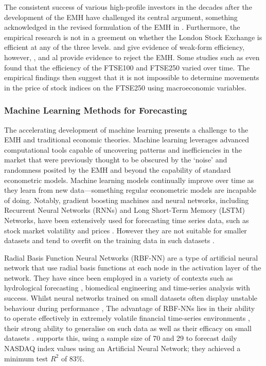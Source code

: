 \documentclass[11pt,a4paper]{article}
\newcommand{\citeboth}[1]{\citeauthor{#1} \citep{#1}}
\begin{document}
The consistent success of various high-profile investors in the decades 
after the development of the EMH have challenged 
its central argument, something acknowledged in the revised formulation of the EMH 
in \citeboth{fama1991}. Furthermore, the empirical research is not in a
greement on whether the London Stock Exchange is efficient at any of the three levels. 
\citeboth{libberton2010} and \citeboth{rounaghi} give evidence of weak-form efficiency,
however, \citeboth{borges2010}, \citeboth{asghar2023} and \citeboth{bhavsar2015} al provide evidence to reject the EMH. 
Some studies such as \citeboth{rosini2020} even found that the 
efficiency of the FTSE100 and FTSE250 varied over time. The empirical findings then suggest 
that it is not impossible to determine movements in the 
price of stock indices on the FTSE250 using macroeconomic variables.

\subsubsection{Machine Learning Methods for Forecasting}

The accelerating development of machine learning presents a challenge to the EMH
and traditional economic theories. 
Machine learning leverages advanced computational 
tools capable of uncovering patterns and inefficiencies 
in the market that were previously thought to be obscured by the 
‘noise’ and randomness posited by the EMH and beyond the capability 
of standard econometric models. Machine learning models continually 
improve over time as they learn from new data—something regular 
econometric models are incapable of doing. Notably, gradient boosting machines and neural networks, including 
Recurrent Neural Networks (RNNs) and Long Short-Term Memory (LSTM) 
Networks, have been extensively used for forecasting time series data, 
such as stock market volatility \citep{cho2022forecasting,praveenraj2023} and prices \citep{zhang2022lstm,song2023forecasting,dutta2024hybrid}. However they 
are not suitable for smaller datasets and tend to overfit on the training data
in such datasets \citep{foster1992}.

Radial Basis Function Neural Networks (RBF-NN) are a type of artificial 
neural network that use radial basis functions at each node in the 
activation layer of the network. They have since been employed in a variety of contexts such as 
hydrological forecasting \citep{chang2001}, biomedical engineering 
\citep{ibrikci2002} and time-series analysis \citep{xiong2015} with success. 
Whilst neural networks trained on small datasets often display unstable 
behaviour during performance \citep{lebaron1998}, The advantage of 
RBF-NNs lies in their ability to 
operate effectively in extremely volatile financial time-series 
environments \citep{cafferata2019}, their strong ability to 
generalise on such data \citep{sharkawy2020} as well as their efficacy on small datasets \citep{kosarac2022}. 
\citeboth{esfandyari2016}
supports this, using a sample size of 70 and 29 to forecast daily NASDAQ 
index values using an Artificial Neural Network; they achieved a minimum
test $R^2$ of 83$\%$. 
\end{document}
